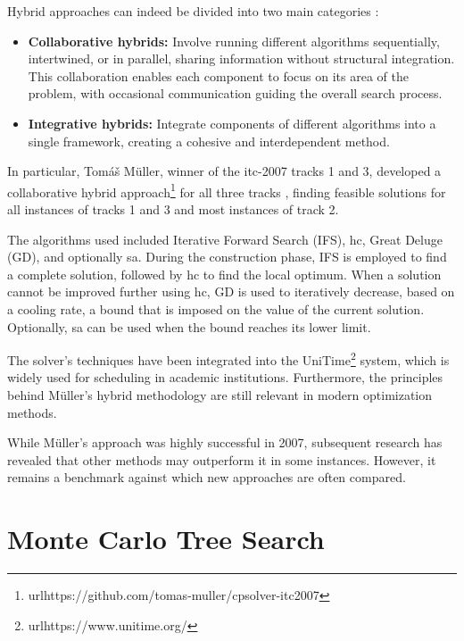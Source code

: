 Hybrid approaches can indeed be divided into two main categories \cite{abdipoor_meta-heuristic_2023}:

\begin{itemize}
\item \textbf{Collaborative hybrids:} Involve running different algorithms sequentially, intertwined, or in parallel, sharing information without structural integration. This collaboration enables each component to focus on its area of the problem, with occasional communication guiding the overall search process.

\item \textbf{Integrative hybrids:} Integrate components of different algorithms into a single framework, creating a cohesive and interdependent method.

\end{itemize}


In particular, Tomáš Müller, winner of the \ac{itc-2007} tracks 1 and 3, developed a collaborative hybrid approach\footnote{url{https://github.com/tomas-muller/cpsolver-itc2007}} for all three tracks \cite{muller_itc2007}, finding feasible solutions for all instances of tracks 1 and 3 and most instances of track 2. 

The algorithms used included Iterative Forward Search (IFS), \ac{hc}, Great Deluge (GD), and optionally \ac{sa}. During the construction phase, IFS is employed to find a complete solution, followed by \ac{hc} to find the local optimum. When a solution cannot be improved further using \ac{hc}, GD is used to iteratively decrease, based on a cooling rate, a bound that is imposed on the value of the current solution. Optionally, \ac{sa} can be used when the bound reaches its lower limit.

The solver's techniques have been integrated into the UniTime\footnote{url{https://www.unitime.org/}} system, which is widely used for scheduling in academic institutions. Furthermore, the principles behind Müller's hybrid methodology are still relevant in modern optimization methods.

While Müller's approach was highly successful in 2007, subsequent research has revealed that other methods may outperform it in some instances. However, it remains a benchmark against which new approaches are often compared.

\section{Monte Carlo Tree Search}

